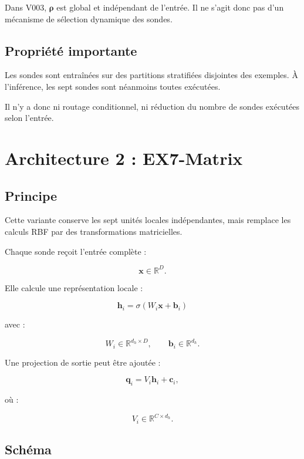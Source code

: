 \documentclass[11pt,a4paper]{article}
\begin{document}
Dans V003, \(\bm{\rho}\) est global et indépendant de l'entrée.
Il ne s'agit donc pas d'un mécanisme de sélection dynamique
des sondes.

\subsection{Propriété importante}

Les sondes sont entraînées sur des partitions stratifiées
disjointes des exemples. À l'inférence, les sept sondes
sont néanmoins toutes exécutées.

Il n'y a donc ni routage conditionnel, ni réduction du nombre
de sondes exécutées selon l'entrée.

\section{Architecture 2 : EX7-Matrix}

\subsection{Principe}

Cette variante conserve les sept unités locales indépendantes,
mais remplace les calculs RBF par des transformations matricielles.

Chaque sonde reçoit l'entrée complète :

\[
  \bm{x}\in\mathbb{R}^{D}.
\]

Elle calcule une représentation locale :

\[
  \boxed{
  \bm{h}_i
  =
  \sigma(W_i\bm{x}+\bm{b}_i)
  }
\]

avec :

\[
  W_i\in\mathbb{R}^{d_h\times D},
  \qquad
  \bm{b}_i\in\mathbb{R}^{d_h}.
\]

Une projection de sortie peut être ajoutée :

\[
  \bm{q}_i
  =
  V_i\bm{h}_i+\bm{c}_i,
\]

où :

\[
  V_i\in\mathbb{R}^{C\times d_h}.
\]

\subsection{Schéma}
\end{document}
